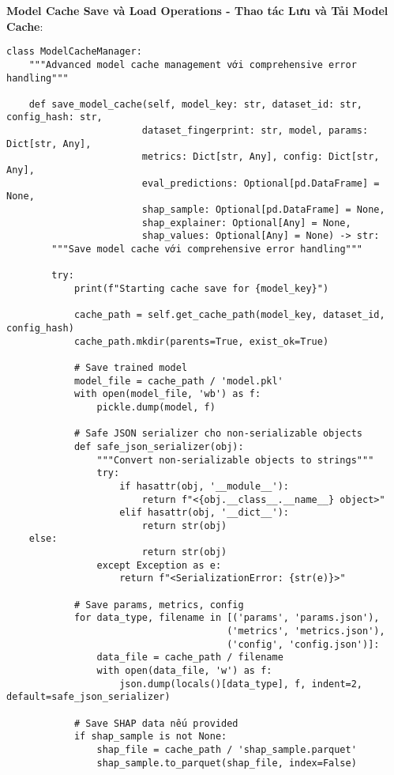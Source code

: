 \textbf{Model Cache Save và Load Operations - Thao tác Lưu và Tải Model Cache}:

\begin{verbatim}
class ModelCacheManager:
    """Advanced model cache management với comprehensive error handling"""
    
    def save_model_cache(self, model_key: str, dataset_id: str, config_hash: str,
                        dataset_fingerprint: str, model, params: Dict[str, Any],
                        metrics: Dict[str, Any], config: Dict[str, Any],
                        eval_predictions: Optional[pd.DataFrame] = None,
                        shap_sample: Optional[pd.DataFrame] = None,
                        shap_explainer: Optional[Any] = None,
                        shap_values: Optional[Any] = None) -> str:
        """Save model cache với comprehensive error handling"""
        
        try:
            print(f"Starting cache save for {model_key}")
            
            cache_path = self.get_cache_path(model_key, dataset_id, config_hash)
            cache_path.mkdir(parents=True, exist_ok=True)
            
            # Save trained model
            model_file = cache_path / 'model.pkl'
            with open(model_file, 'wb') as f:
                pickle.dump(model, f)
            
            # Safe JSON serializer cho non-serializable objects
            def safe_json_serializer(obj):
                """Convert non-serializable objects to strings"""
                try:
                    if hasattr(obj, '__module__'):
                        return f"<{obj.__class__.__name__} object>"
                    elif hasattr(obj, '__dict__'):
                        return str(obj)
    else:
                        return str(obj)
                except Exception as e:
                    return f"<SerializationError: {str(e)}>"
            
            # Save params, metrics, config
            for data_type, filename in [('params', 'params.json'), 
                                       ('metrics', 'metrics.json'), 
                                       ('config', 'config.json')]:
                data_file = cache_path / filename
                with open(data_file, 'w') as f:
                    json.dump(locals()[data_type], f, indent=2, default=safe_json_serializer)
            
            # Save SHAP data nếu provided
            if shap_sample is not None:
                shap_file = cache_path / 'shap_sample.parquet'
                shap_sample.to_parquet(shap_file, index=False)
            

\end{verbatim}
